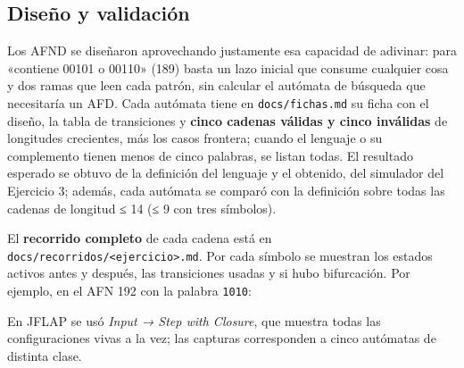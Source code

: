 \hypertarget{diseuxf1o-y-validaciuxf3n}{%
\subsection{Diseño y validación}\label{diseuxf1o-y-validaciuxf3n}}

Los AFND se diseñaron aprovechando justamente esa capacidad de adivinar: para «contiene 00101 o 00110» (189) basta un lazo inicial que consume cualquier cosa y dos ramas que leen cada patrón, sin calcular el autómata de búsqueda que necesitaría un AFD. Cada autómata tiene en \texttt{docs/fichas.md} su ficha con el diseño, la tabla de transiciones y \textbf{cinco cadenas válidas y cinco inválidas} de longitudes crecientes, más los casos frontera; cuando el lenguaje o su complemento tienen menos de cinco palabras, se listan todas. El resultado esperado se obtuvo de la definición del lenguaje y el obtenido, del simulador del Ejercicio 3; además, cada autómata se comparó con la definición sobre todas las cadenas de longitud ≤ 14 (≤ 9 con tres símbolos).

El \textbf{recorrido completo} de cada cadena está en \texttt{docs/recorridos/\textless{}ejercicio\textgreater{}.md}. Por cada símbolo se muestran los estados activos antes y después, las transiciones usadas y si hubo bifurcación. Por ejemplo, en el AFN 192 con la palabra \texttt{1010}:

\begin{Shaded}
\begin{Highlighting}[]
\end{Highlighting}
\end{Shaded}

En JFLAP se usó \emph{Input → Step with Closure}, que muestra todas las configuraciones vivas a la vez; las capturas corresponden a cinco autómatas de distinta clase.



